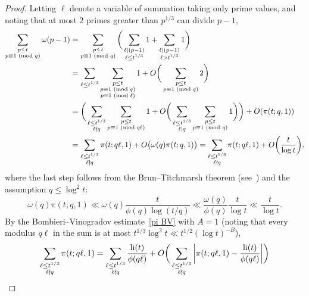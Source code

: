 \documentclass[12pt,reqno]{amsart}
\theoremstyle{definition}
\renewcommand{\mod}[1]{{\ifmmode\text{\rm\ (mod~$#1$)}\else\discretionary{}{}{\hbox{ }}\rm(mod~$#1$)\fi}}
\newcommand{\li}{\mathop{\rm li}\nolimits}
\begin{document}
\begin{proof}
Letting $\ell$ denote a variable of summation taking only prime values, and noting that at most $2$ primes greater than $p^{1/3}$ can divide $p-1$,
\begin{align}
\sum_{\substack{p \leq t \\ p \equiv 1 \mod q}} \omega(p-1) &= \sum_{\substack{p \leq t \\ p \equiv 1 \mod q}} \bigg( \sum_{\substack{\ell\mid(p-1) \\ \ell\le t^{1/3}}} 1 + \sum_{\substack{\ell\mid(p-1) \\ \ell> t^{1/3}}} 1 \bigg) \notag \\
&= \sum_{\substack{\ell \leq t^{1/3}}} \sum_{\substack{p \leq t \\ p \equiv 1 \mod q \\ p \equiv 1 \mod \ell}} 1 + O\bigg( \sum_{\substack{p \leq t \\ p \equiv 1 \mod q}} 2 \bigg) \notag \\
&= \bigg( \sum_{\substack{\ell \leq t^{1/3} \\ \ell \nmid q}} \sum_{\substack{p \leq t \\ p \equiv 1 \mod{q\ell}}} 1 + O\bigg( \sum_{\substack{\ell \leq t^{1/3} \\ \ell \mid q}} \sum_{\substack{p \leq t \\ p \equiv 1 \mod{q}}} 1 \bigg) \bigg) + O(\pi(t;q,1)) \notag \\
&= \sum_{\substack{\ell \leq t^{1/3} \\ \ell \nmid q}} \pi(t;q\ell,1) + O\big( \omega(q) \pi(t;q,1) \big) = \sum_{\substack{\ell \leq t^{1/3} \\ \ell \nmid q}} \pi(t;q\ell,1) + O\bigg( \frac t{\log t} \bigg),  \label{formerly S1 and S2}
\end{align}
where the last step follows from the Brun--Titchmarsh theorem (see~\cite[Theorem 3.9]{mv07}) and the assumption $q\le \log^2 t$:
\begin{equation}  \label{BT usage}
\omega(q) \pi(t;q,1) \ll \omega(q) \frac{t}{\phi(q)\log(t/q)} \ll \frac{\omega(q)}{\phi(q)} \frac{t}{\log t} \ll \frac t{\log t}.
\end{equation}
By the Bombieri--Vinogradov estimate~\eqref{pi BV} with $A=1$ (noting that every modulus $q\ell$ in the sum is at most $t^{1/3}\log^2 t \ll t^{1/2}(\log t)^{-B}$),
\begin{align}
\sum_{\substack{\ell \leq t^{1/3} \\ \ell \nmid q}} \pi(t;q\ell,1) &= \sum_{\substack{\ell \leq t^{1/3} \\ \ell \nmid q}} \frac{\li(t)}{\phi(q\ell)} + O\bigg( \sum_{\substack{\ell \leq t^{1/3} \\ \ell \nmid q}} \bigg| \pi(t;q\ell,1) - \frac{\li(t)}{\phi(q\ell)} \bigg| \bigg) \notag \\

\end{align}
\end{proof}
\end{document}
